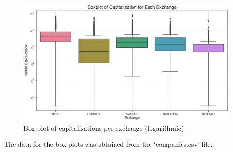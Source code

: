 \documentclass[12pt]{article}
\begin{document}
\begin{figure}[h!]
    \centering
    \includegraphics[width=1\textwidth]{P1.5.png}
    \caption{Box-plot of capitalizations per exchange (logarithmic)}
    \label{fig:1.5}
\end{figure}

The data for the box-plots was obtained from the 
`companies.csv' file.
\end{document}
